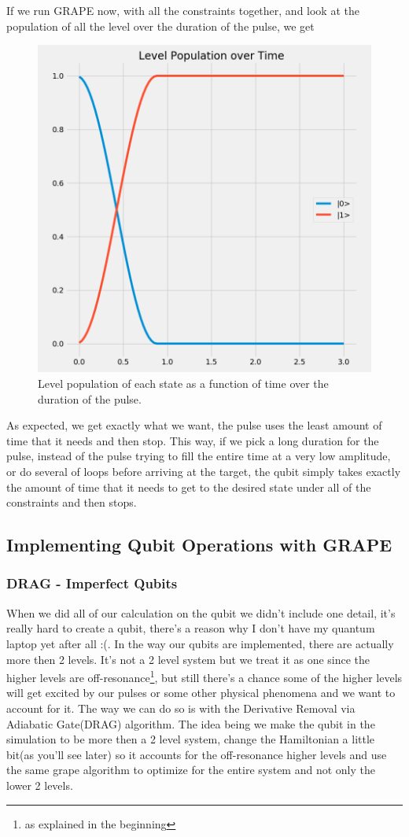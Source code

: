 \documentclass[english, a4paper, 12pt, twoside]{article}
\numberwithin{equation}{section} %
\begin{document}
If we run GRAPE now, with all the constraints together, and look at the population of all the level over the duration of the pulse, we get
\begin{figure}[H]
    \centering
    \includegraphics[width=0.5\columnwidth]{Results/duration-constraint/level-population.png}
    \caption{Level population of each state as a function of time over the duration of the pulse.}
    \label{fig:dur-penelty}
\end{figure}

As expected, we get exactly what we want, the pulse uses the least amount of time that it needs and then stop. This way, if we pick a long duration for the pulse, instead of the pulse trying to fill the entire time at a very low amplitude, or do several of loops before arriving at the target, the qubit simply takes exactly the amount of time that it needs to get to the desired state under all of the constraints and then stops.

\subsection{Implementing Qubit Operations with GRAPE}

\subsubsection{DRAG - Imperfect Qubits}
When we did all of our calculation on the qubit we didn't include one detail, it's really hard to create a qubit, there's a reason why I don't have my quantum laptop yet after all :(. In the way our qubits are implemented, there are actually more then 2 levels. It's not a 2 level system but we treat it as one since the higher levels are off-resonance\footnote{as explained in the beginning}, but still there's a chance some of the higher levels will get excited by our pulses or some other physical phenomena and we want to account for it. The way we can do so is with the Derivative Removal via Adiabatic Gate(DRAG) algorithm. The idea being we make the qubit in the simulation to be more then a 2 level system, change the Hamiltonian a little bit(as you'll see later) so it accounts for the off-resonance higher levels and use the same grape algorithm to optimize for the entire system and not only the lower 2 levels.
\end{document}
